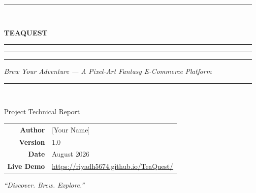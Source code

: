 \documentclass[11pt,a4paper]{article}
\newcommand{\ReportTitle}{TEAQUEST}
\newcommand{\ReportSubtitle}{Brew Your Adventure --- A Pixel-Art Fantasy E-Commerce Platform}
\newcommand{\ReportAuthor}{[Your Name]}
\newcommand{\ReportDate}{August 2026}
\begin{document}

\begin{titlepage}
    \centering
    \vspace*{2cm}

    {\color{teagreen}\rule{\linewidth}{2pt}}\\[0.6cm]

    {\Huge\bfseries\scshape \ReportTitle\par}
    \vspace{0.5cm}
    {\color{teagreen}\rule{12pt}{12pt}}%
    {\color{teagold}\rule{12pt}{12pt}}%
    {\color{teagreen}\rule{12pt}{12pt}}\par
    \vspace{0.5cm}
    {\Large\itshape \ReportSubtitle\par}

    \vspace{0.5cm}
    {\color{teagreen}\rule{\linewidth}{2pt}}\\[2cm]

    {\large Project Technical Report\par}
    \vspace{1.5cm}

    \begin{tabular}{rl}
        \textbf{Author}      & \ReportAuthor \\[4pt]
        \textbf{Version}     & 1.0 \\[4pt]
        \textbf{Date}        & \ReportDate \\[4pt]
        \textbf{Live Demo}   & \url{https://riyadh5674.github.io/TeaQuest/} \\
    \end{tabular}

    \vfill
    {\small\itshape ``Discover. Brew. Explore.''\par}
    \vspace{1cm}
\end{titlepage}


\begin{abstract}
\noindent
\textbf{TeaQuest} is a premium tea e-commerce web application wrapped in an
original pixel-art fantasy theme. The project combines a complete shopping
experience --- browsing, filtering, favorites, cart, checkout and order
history --- with game-inspired mechanics such as experience points, quests,
achievements, a discovery codex, a randomized ``Tea Roulette'' and a
personality-based ``Tea Oracle'' recommender. The frontend is built entirely
with vanilla HTML5, CSS3 and JavaScript, requiring no frameworks or build
tools. Persistence uses a hybrid model: a local-first \texttt{localStorage}
layer with a Supabase backend (PostgreSQL, authentication and row-level
security) layered on top. This report documents the system architecture,
frontend design, functional modules, database schema, security model and
known limitations, and outlines the roadmap toward a production-ready
platform.
\end{abstract}
\end{document}
